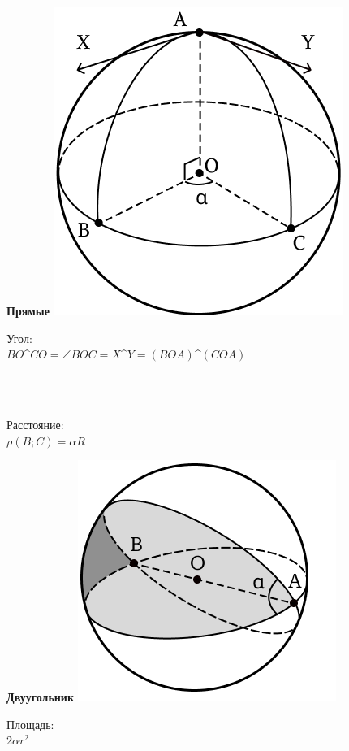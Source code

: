     \begin{minipage}[t]{0.25 \textwidth}
        \begin{center}
            \textbf{Прямые}
            \includegraphics[width=0.7\linewidth]{images/img2}\\
        \end{center}
        \begin{flushleft}
            Угол:\\
            $BO$\textasciicircum$CO=\angle BOC = X$\textasciicircum$Y = (BOA)$\textasciicircum$(COA)$
        \end{flushleft}\\ \

        Расстояние:\\
        $\rho(B;C) = \alpha R$


    \end{minipage}
    \begin{minipage}[t]{0.25 \textwidth}
        \begin{center}
            \textbf{Двуугольник}
            \includegraphics[width=0.8\linewidth]{images/img3}\\
        \end{center}
        Площадь:\\
        $2\alpha r^2$
    \end{minipage}
